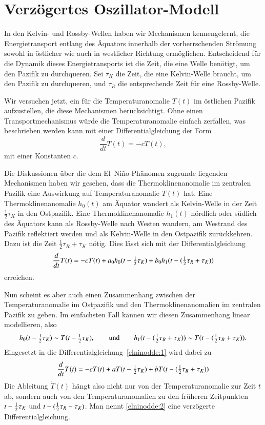 %
%
%
\section{Verzögertes Oszillator-Modell\label{section:dde-nino}}
In den Kelvin- und Rossby-Wellen haben wir Mechanismen kennengelernt,
die Energietransport entlang des Äquators innerhalb der vorherrschenden
Strömung sowohl in östlicher wie auch in westlicher Richtung ermöglichen.
Entscheidend für die Dynamik dieses Energietransports ist die Zeit,
die eine Welle benötigt, um den Pazifik zu durchqueren.
Sei $\tau_K$ die Zeit, die eine Kelvin-Welle braucht, um den Pazifik
zu durchqueren, und $\tau_R$ die entsprechende Zeit für eine Rossby-Welle.

Wir versuchen jetzt, ein für die Temperaturanomalie $T(t)$ im östlichen
Pazifik aufzustellen, die diese Mechanismen berücksichtigt.
Ohne einen Transportmechanismus würde die Temperaturanomalie einfach
zerfallen, was beschrieben werden kann mit einer Differentialgleichung
der Form
\[
\frac{d}{dt}T(t)
=
-cT(t),
\]
mit einer Konstanten $c$.

\def\halb{\bgroup\textstyle\frac12\egroup}

Die Diskussionen über die dem El~Niño-Phänomen zugrunde liegenden
Mechanismen haben wir gesehen, dass die Thermoklinenanomalie im
zentralen Pazifik eine Auswirkung auf Temperatur\-anomalie $T(t)$ hat.
Eine Thermoklinenanomalie $h_0(t)$ am Äquator wandert als
Kelvin-Welle in der Zeit $\frac12\tau_K$ in den Ostpazifik.
Eine Thermoklinenanomalie $h_1(t)$ nördlich oder südlich des Äquators
kann als Rossby-Welle nach Westen wandern, am Westrand des Pazifik
reflektiert werden und als Kelvin-Welle in den Ostpazifik zurückkehren.
Dazu ist die Zeit $\frac12\tau_R+\tau_K$ nötig.
Dies lässt sich mit der Differentialgleichung
\begin{equation}
\frac{d}{dt}T(t)
=
-cT(t) + a_0h_0(t-\halb\tau_K) + b_0h_1(t-(\halb\tau_R+\tau_K))
\label{elninodde:1}
\end{equation}
erreichen.

Nun scheint es aber auch einen Zusammenhang zwischen der Temperaturanomalie
im Ostpazifik und den Thermoklinenanomalien im zentralen Pazifik zu geben.
Im einfachsten Fall kännen wir diesen Zusammenhang linear modellieren,
also 
\[
h_0(t-\halb\tau_K)
\sim
T(t-\halb\tau_K),
\qquad
\text{und}
\qquad
h_1(t-(\halb\tau_R+\tau_K))
\sim
T(t-(\halb\tau_R+\tau_K)).
\]
Eingesetzt in die Differentialgleichung~\eqref{elninodde:1} wird dabei zu
\begin{equation}
\frac{d}{dt}T(t)
=
-cT(t) + aT(t-\halb\tau_K) + bT(t-(\halb\tau_R+\tau_K))
\label{elninodde:2}
\end{equation}
Die Ableitung $\dot T(t)$ hängt also nicht nur von der Temperaturanomalie
zur Zeit $t$ ab, sondern auch von den Temperaturanomalien zu den
früheren Zeitpunkten $t-\halb\tau_K$ und $t-(\halb\tau_R-\tau_K)$.
Man nennt
\eqref{elninodde:2}
eine verzögerte Differentialgleichung.
%


